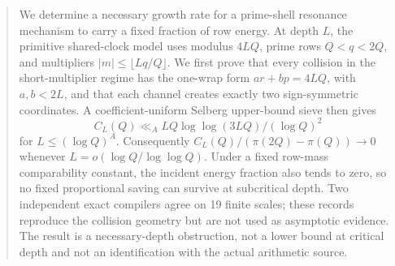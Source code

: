 \begin{abstract}
We determine a necessary growth rate for a prime-shell resonance mechanism to
carry a fixed fraction of row energy.  At depth \(L\), the primitive
shared-clock model uses modulus \(4LQ\), prime rows \(Q<q<2Q\), and
multipliers \(|m|\le \lfloor Lq/Q\rfloor\).  We first prove that every
collision in the short-multiplier regime has the one-wrap form
\(ar+bp=4LQ\), with \(a,b<2L\), and that each channel creates exactly two
sign-symmetric coordinates.  A coefficient-uniform Selberg upper-bound sieve
then gives
\[
 C_L(Q)\ll_A LQ\log\log(3LQ)/(\log Q)^2
\]
for \(L\le(\log Q)^A\).  Consequently
\(C_L(Q)/(\pi(2Q)-\pi(Q))\to0\) whenever
\(L=o(\log Q/\log\log Q)\).  Under a fixed row-mass comparability constant,
the incident energy fraction also tends to zero, so no fixed proportional
saving can survive at subcritical depth.  Two independent exact compilers
agree on 19 finite scales; these records reproduce the collision geometry but
are not used as asymptotic evidence.  The result is a necessary-depth
obstruction, not a lower bound at critical depth and not an identification
with the actual arithmetic source.
\end{abstract}
